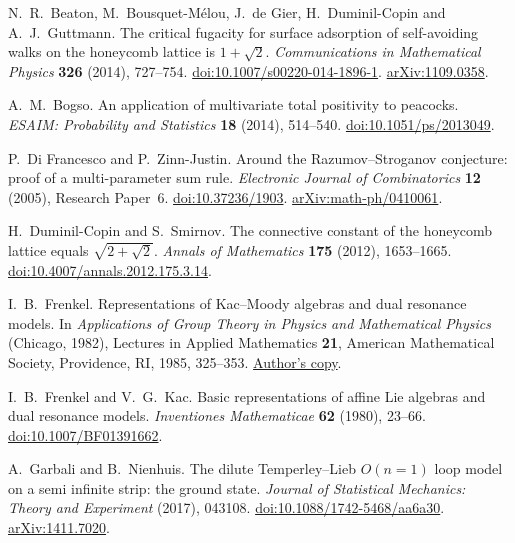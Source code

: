 N.~R.~Beaton, M.~Bousquet-M\'elou, J.~de Gier, H.~Duminil-Copin and A.~J.~Guttmann.
The critical fugacity for surface adsorption of self-avoiding walks on the honeycomb lattice is $1+\sqrt2$.
\emph{Communications in Mathematical Physics} \textbf{326} (2014), 727--754.
\href{https://doi.org/10.1007/s00220-014-1896-1}{doi:10.1007/s00220-014-1896-1}.
\href{https://arxiv.org/abs/1109.0358}{arXiv:1109.0358}.

A.~M.~Bogso.
An application of multivariate total positivity to peacocks.
\emph{ESAIM: Probability and Statistics} \textbf{18} (2014), 514--540.
\href{https://doi.org/10.1051/ps/2013049}{doi:10.1051/ps/2013049}.

P.~Di Francesco and P.~Zinn-Justin.
Around the Razumov--Stroganov conjecture: proof of a multi-parameter sum rule.
\emph{Electronic Journal of Combinatorics} \textbf{12} (2005), Research Paper~6.
\href{https://doi.org/10.37236/1903}{doi:10.37236/1903}.
\href{https://arxiv.org/abs/math-ph/0410061}{arXiv:math-ph/0410061}.

H.~Duminil-Copin and S.~Smirnov.
The connective constant of the honeycomb lattice equals $\sqrt{2+\sqrt2}$.
\emph{Annals of Mathematics} \textbf{175} (2012), 1653--1665.
\href{https://doi.org/10.4007/annals.2012.175.3.14}{doi:10.4007/annals.2012.175.3.14}.

I.~B.~Frenkel.
Representations of Kac--Moody algebras and dual resonance models.
In \emph{Applications of Group Theory in Physics and Mathematical Physics}
(Chicago, 1982), Lectures in Applied Mathematics \textbf{21},
American Mathematical Society, Providence, RI, 1985, 325--353.
\href{https://cpb-us-w2.wpmucdn.com/campuspress.yale.edu/dist/2/3739/files/2021/06/frenkel_representations_kac_moody.pdf}{Author's copy}.

I.~B.~Frenkel and V.~G.~Kac.
Basic representations of affine Lie algebras and dual resonance models.
\emph{Inventiones Mathematicae} \textbf{62} (1980), 23--66.
\href{https://doi.org/10.1007/BF01391662}{doi:10.1007/BF01391662}.

A.~Garbali and B.~Nienhuis.
The dilute Temperley--Lieb $O(n=1)$ loop model on a semi infinite strip:
the ground state.
\emph{Journal of Statistical Mechanics: Theory and Experiment} (2017), 043108.
\href{https://doi.org/10.1088/1742-5468/aa6a30}{doi:10.1088/1742-5468/aa6a30}.
\href{https://arxiv.org/abs/1411.7020}{arXiv:1411.7020}.

